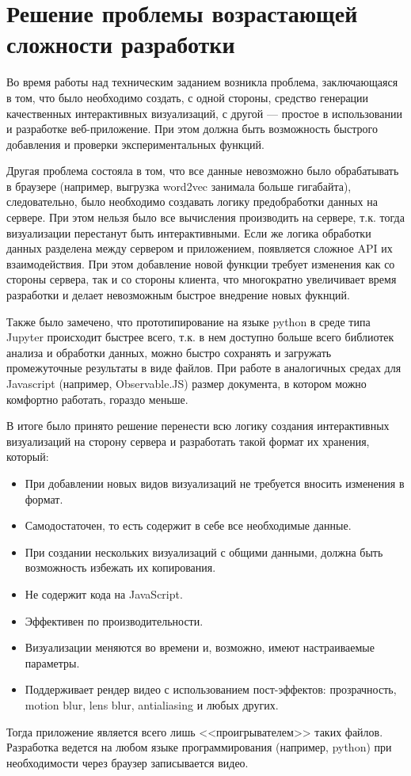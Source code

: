 \section{Решение проблемы возрастающей сложности разработки}

Во время работы над техническим заданием возникла проблема, заключающаяся в том, что было необходимо создать, с одной стороны, средство генерации качественных интерактивных визуализаций, с другой --- простое в использовании и разработке веб-приложение. При этом должна быть возможность быстрого добавления и проверки экспериментальных функций.

Другая проблема состояла в том, что все данные невозможно было обрабатывать в браузере (например, выгрузка word2vec занимала больше гигабайта), следовательно, было необходимо создавать логику предобработки данных на сервере. При этом нельзя было все вычисления производить на сервере, т.к. тогда визуализации перестанут быть интерактивными. Если же логика обработки данных разделена между сервером и приложением, появляется сложное API их взаимодействия. При этом добавление новой функции требует изменения как со стороны сервера, так и со стороны клиента, что многократно увеличивает время разработки и делает невозможным быстрое внедрение новых фукнций.

Также было замечено, что прототипирование на языке python в среде типа Jupyter происходит быстрее всего, т.к. в нем доступно больше всего библиотек анализа и обработки данных, можно быстро сохранять и загружать промежуточные результаты в виде файлов. При работе в аналогичных средах для Javascript (например, Observable.JS) размер документа, в котором можно комфортно работать, гораздо меньше.

В итоге было принято решение перенести всю логику создания интерактивных визуализаций на сторону сервера и разработать такой формат их хранения, который:
\begin{itemize}
\item При добавлении новых видов визуализаций не требуется вносить изменения в формат.
\item Самодостаточен, то есть содержит в себе все необходимые данные.
\item При создании нескольких визуализаций с общими данными, должна быть возможность избежать их копирования.
\item Не содержит кода на JavaScript.
\item Эффективен по производительности.
\item Визуализации меняются во времени и, возможно, имеют настраиваемые параметры.
\item Поддерживает рендер видео с использованием пост-эффектов: прозрачность, motion blur, lens blur, antialiasing и любых других.
\end{itemize}
Тогда приложение является всего лишь <<проигрывателем>> таких файлов. Разработка ведется на любом языке программирования (например, python) при необходимости через браузер записывается видео.

